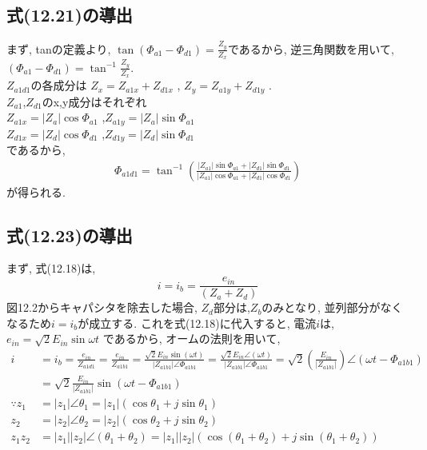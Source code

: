 \documentclass[fleqn,11pt,a4paper,dvipdfmx]{jsarticle}
\numberwithin{equation}{section}
\begin{document}
\subsection*{式(12.21)の導出}
まず, tanの定義より, $\tan\left(\Phi_{a1} - \Phi_{d1}\right) = \frac{Z_y}{Z_x}$であるから, 
逆三角関数を用いて, 
$\left(\Phi_{a1} - \Phi_{d1}\right) = \tan^{-1}\frac{Z_y}{Z_x}$.\\
$Z_{a1d1}$の各成分は
$Z_x = Z_{a1x} + Z_{d1x}$ , $Z_y = Z_{a1y} + Z_{d1y}$ .\\
$Z_{a1}$,$Z_{d1}$のx,y成分はそれぞれ\\
$Z_{a1x} = \left|Z_a\right| \cos \Phi_{a1}$ ,$Z_{a1y} = \left|Z_a\right| \sin \Phi_{a1}$\\
$Z_{d1x} = \left|Z_d\right| \cos \Phi_{d1}$ ,$Z_{d1y} = \left|Z_d\right| \sin \Phi_{d1}$\\
であるから, 
\begin{align*}
  \Phi_{a1d1} = \tan^{-1}\left( \frac{\left| Z_{a1} \right| \sin \Phi_{a1} + \left| Z_{d1} \right| \sin \Phi_{d1} }{\left| Z_{a1} \right| \cos \Phi_{a1} + \left| Z_{d1} \right| \cos \Phi_{d1}}\right)
\end{align*}
が得られる. 

\subsection*{式(12.23)の導出}
まず, 式(12.18)は, 
\begin{equation*}
  i = i_b = \frac{e_{in}}{\left(Z_a + Z_d\right)}
\end{equation*}
図12.2からキャパシタを除去した場合, $Z_d$部分は,$Z_b$のみとなり, 
並列部分がなくなるため$i = i_b$が成立する. 
これを式(12.18)に代入すると, 電流$i$は, 
$e_{in} = \sqrt{2}E_{in}\sin \omega t$
であるから, オームの法則を用いて, 
\begin{align*}
  i & = i_b = \frac{e_{in}}{Z_{a1d1}} = \frac{e_{in}}{Z_{a1b1}} = \frac{\sqrt{2}E_{in}\sin \left(\omega t\right)}{\left|Z_{a1b1}\right| \angle \Phi_{a1b1}}
  = \frac{ \sqrt{2}{E_{in}} \angle \left( \omega t \right)}{\left| Z_{a1b1} \right| \angle \Phi_{a1b1}} = \sqrt{2} {\left(\frac{E_{in}}{\left|Z_{a1b1}\right|}\right)} \angle{\left(\omega t - \Phi_{a1b1}\right)} \\
    & = \sqrt{2} \frac{ E_{in} }{\left| Z_{a1b1} \right|}\sin \left(\omega t - \Phi_{a1b1}\right) \\
    \because  z_1 &= \left| z_1 \right| \angle \theta_1 = \left| z_1 \right| \left(\cos \theta_1 + j \sin \theta_1\right) \\
              z_2 &= \left| z_2 \right| \angle \theta_2 = \left| z_2\right| \left(\cos \theta_2 + j \sin \theta_2\right)  \\
              z_1z_2 &= \left| z_1 \right|\left| z_2 \right| \angle \left(\theta_1 + \theta_2\right) = \left| z_1 \right|\left| z_2\right| \left(\cos \left(\theta_1 + \theta_2\right) + j \sin \left(\theta_1 + \theta_2\right)\right)
\end{align*}
\end{document}
